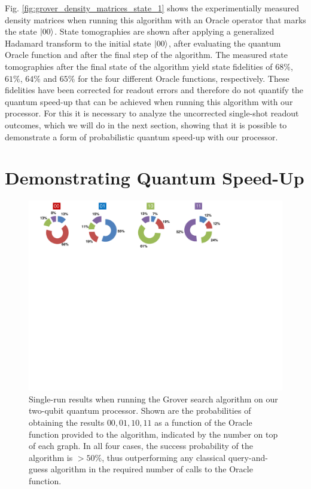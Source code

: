 Fig. \ref{fig:grover_density_matrices_state_1} shows the experimentially measured density matrices when running this algorithm with an Oracle operator that marks the state $\left| 00 \right>$. State tomographies are shown after applying a generalized Hadamard transform to the initial state $\left| 00 \right>$, after evaluating the quantum Oracle function and after the final step of the algorithm. The measured state tomographies after the final state of the algorithm yield state fidelities of $68 \%$, $61 \%$, $64 \%$ and $65 \%$ for the four different Oracle functions, respectively. These fidelities have been corrected for readout errors and therefore do not quantify the quantum speed-up that can be achieved when running this algorithm with our processor. For this it is necessary to analyze the uncorrected single-shot readout outcomes, which we will do in the next section, showing that it is possible to demonstrate a form of probabilistic quantum speed-up with our processor.

\section{Demonstrating Quantum Speed-Up}

\begin{figure}[ht!]
		\centering
		\includegraphics[width=1.0\textwidth]{./material/papers/grover/figures/grover_algorithm_single_shot_probabilities}
	\caption[Single-run results of the Grover search algorithm]{Single-run results when running the Grover search algorithm on our two-qubit quantum processor. Shown are the probabilities of obtaining the results $00,01,10,11$ as a function of the Oracle function provided to the algorithm, indicated by the number on top of each graph. In all four cases, the success probability of the algorithm is $> 50 \%$, thus outperforming any classical query-and-guess algorithm in the required number of calls to the Oracle function.}
	\label{fig:grover_single_shot_probabilities}
\end{figure}

